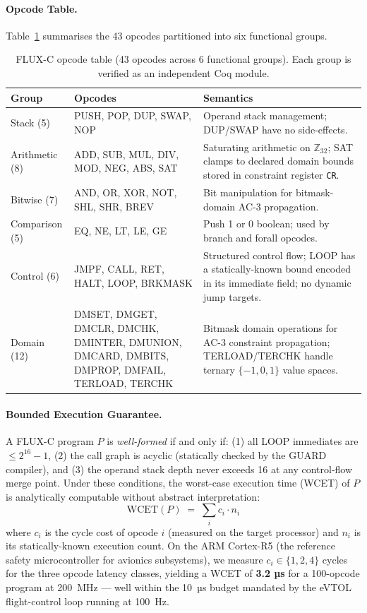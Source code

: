 \documentclass[sigplan,review,anonymous]{acmart}
\begin{document}
\paragraph{Opcode Table.}
Table~\ref{tab:opcodes} summarises the 43 opcodes partitioned into six
functional groups.

\begin{table}[t]
\centering
\caption{FLUX-C opcode table (43 opcodes across 6 functional groups).
Each group is verified as an independent Coq module.}
\label{tab:opcodes}
\renewcommand{\arraystretch}{1.15}
\begin{tabular}{llp{5.5cm}}
\toprule
\textbf{Group} & \textbf{Opcodes} & \textbf{Semantics} \\
\midrule
Stack (5)     & PUSH, POP, DUP, SWAP, NOP
              & Operand stack management; DUP/SWAP have no side-effects. \\
Arithmetic (8) & ADD, SUB, MUL, DIV, MOD, NEG, ABS, SAT
              & Saturating arithmetic on $\mathbb{Z}_{32}$; SAT clamps to
                declared domain bounds stored in constraint register \texttt{CR}. \\
Bitwise (7)   & AND, OR, XOR, NOT, SHL, SHR, BREV
              & Bit manipulation for bitmask-domain AC-3 propagation. \\
Comparison (5) & EQ, NE, LT, LE, GE
              & Push 1 or 0 boolean; used by branch and forall opcodes. \\
Control (6)   & JMPF, CALL, RET, HALT, LOOP, BRKMASK
              & Structured control flow; LOOP has a statically-known bound
                encoded in its immediate field; no dynamic jump targets. \\
Domain (12)   & DMSET, DMGET, DMCLR, DMCHK, DMINTER, DMUNION,
                DMCARD, DMBITS, DMPROP, DMFAIL, TERLOAD, TERCHK
              & Bitmask domain operations for AC-3 constraint propagation;
                TERLOAD/TERCHK handle ternary $\{-1,0,1\}$ value spaces. \\
\bottomrule
\end{tabular}
\end{table}

\paragraph{Bounded Execution Guarantee.}
A FLUX-C program $P$ is \emph{well-formed} if and only if:
(1) all LOOP immediates are $\le 2^{16}-1$,
(2) the call graph is acyclic (statically checked by the GUARD compiler),
and (3) the operand stack depth never exceeds 16 at any control-flow merge
point.
Under these conditions, the worst-case execution time (WCET) of $P$ is
analytically computable without abstract interpretation:
\[
  \mathrm{WCET}(P) \;=\; \sum_{i} c_i \cdot n_i
\]
where $c_i$ is the cycle cost of opcode $i$ (measured on the target
processor) and $n_i$ is its statically-known execution count.
On the ARM Cortex-R5 (the reference safety microcontroller for avionics
subsystems), we measure $c_i \in \{1, 2, 4\}$ cycles for the three
opcode latency classes, yielding a WCET of \textbf{3.2 µs} for a
100-opcode program at 200~MHz — well within the 10~µs budget mandated
by the eVTOL flight-control loop running at 100~Hz.
\end{document}
